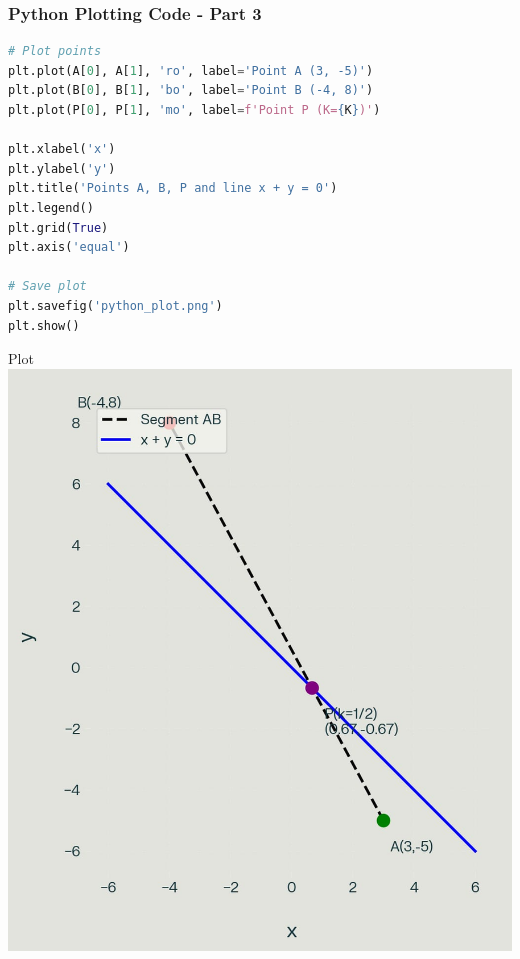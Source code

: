 \documentclass{beamer}
\begin{document}
\begin{frame}[fragile]
\frametitle{\textbf{Python Plotting Code - Part 3}}
\begin{lstlisting}[language=Python]
# Plot points
plt.plot(A[0], A[1], 'ro', label='Point A (3, -5)')
plt.plot(B[0], B[1], 'bo', label='Point B (-4, 8)')
plt.plot(P[0], P[1], 'mo', label=f'Point P (K={K})')

plt.xlabel('x')
plt.ylabel('y')
plt.title('Points A, B, P and line x + y = 0')
plt.legend()
plt.grid(True)
plt.axis('equal')

# Save plot
plt.savefig('python_plot.png')
plt.show()
\end{lstlisting}
\end{frame}




\begin{frame}{Plot}
    \centering
    \includegraphics[width=\columnwidth, height=0.8\textheight, keepaspectratio]{figs/python_plot.png}     
\end{frame}
\end{document}
